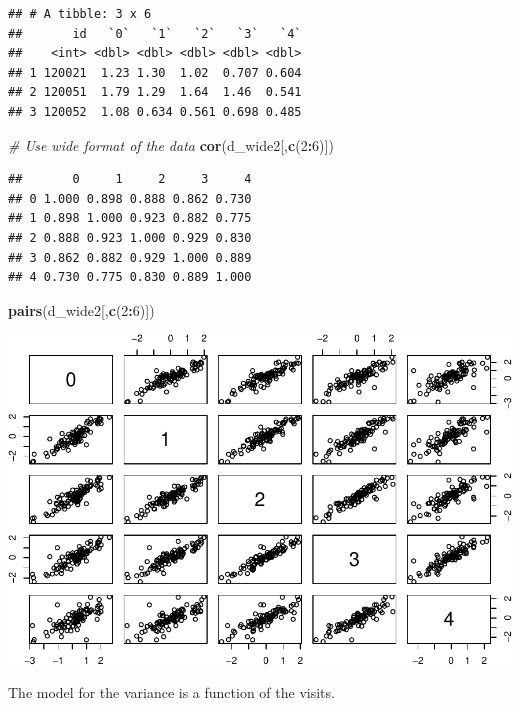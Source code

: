 \documentclass[
]{article}
\newenvironment{Shaded}{\begin{snugshade}}{\end{snugshade}}
\newcommand{\CommentTok}[1]{\textcolor[rgb]{0.56,0.35,0.01}{\textit{#1}}}
\newcommand{\DecValTok}[1]{\textcolor[rgb]{0.00,0.00,0.81}{#1}}
\newcommand{\FunctionTok}[1]{\textcolor[rgb]{0.13,0.29,0.53}{\textbf{#1}}}
\newcommand{\NormalTok}[1]{#1}
\newcommand{\SpecialCharTok}[1]{\textcolor[rgb]{0.81,0.36,0.00}{\textbf{#1}}}
\begin{document}
\begin{verbatim}
## # A tibble: 3 x 6
##       id   `0`   `1`   `2`   `3`   `4`
##    <int> <dbl> <dbl> <dbl> <dbl> <dbl>
## 1 120021  1.23 1.30  1.02  0.707 0.604
## 2 120051  1.79 1.29  1.64  1.46  0.541
## 3 120052  1.08 0.634 0.561 0.698 0.485
\end{verbatim}

\begin{Shaded}
\begin{Highlighting}[]
\CommentTok{\# Use wide format of the data}
\FunctionTok{cor}\NormalTok{(d\_wide2[,}\FunctionTok{c}\NormalTok{(}\DecValTok{2}\SpecialCharTok{:}\DecValTok{6}\NormalTok{)])}
\end{Highlighting}
\end{Shaded}

\begin{verbatim}
##       0     1     2     3     4
## 0 1.000 0.898 0.888 0.862 0.730
## 1 0.898 1.000 0.923 0.882 0.775
## 2 0.888 0.923 1.000 0.929 0.830
## 3 0.862 0.882 0.929 1.000 0.889
## 4 0.730 0.775 0.830 0.889 1.000
\end{verbatim}

\begin{Shaded}
\begin{Highlighting}[]
\FunctionTok{pairs}\NormalTok{(d\_wide2[,}\FunctionTok{c}\NormalTok{(}\DecValTok{2}\SpecialCharTok{:}\DecValTok{6}\NormalTok{)])}
\end{Highlighting}
\end{Shaded}

\includegraphics{ProblemSet3_Siyu_Zou_files/figure-latex/unnamed-chunk-15-1.pdf}

The model for the variance is a function of the visits.
\end{document}
